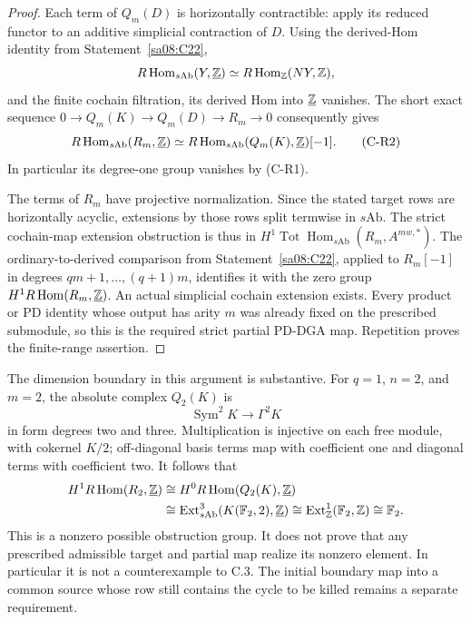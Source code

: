 \begin{proof}
Each term of $Q_m(D)$ is horizontally contractible: apply its
reduced functor to an additive simplicial contraction of $D$.
Using the derived-Hom identity from
Statement~\ref{sa08:C22},
\[
 R\operatorname{Hom}_{s\mathrm{Ab}}(Y,\underline{\mathbb Z})
       \simeq R\operatorname{Hom}_{\mathbb Z}(NY,\mathbb Z),
\]
and the finite cochain filtration, its derived Hom into
$\underline{\mathbb Z}$ vanishes. The short exact sequence
$0\to Q_m(K)\to Q_m(D)\to R_m\to0$ consequently gives
\begin{equation}
 R\operatorname{Hom}_{s\mathrm{Ab}}(R_m,\underline{\mathbb Z})
 \simeq
 R\operatorname{Hom}_{s\mathrm{Ab}}(Q_m(K),\underline{\mathbb Z})[-1].
 \tag{C-R2}
\end{equation}
In particular its degree-one group vanishes by (C-R1).

The terms of $R_m$ have projective normalization. Since the
stated target rows are horizontally acyclic, extensions by those
rows split termwise in $s\mathrm{Ab}$. The strict cochain-map
extension obstruction is thus in
$H^1\operatorname{Tot}\operatorname{Hom}_{s\mathrm{Ab}}
(R_m,A^{mw,*})$. The ordinary-to-derived comparison from
Statement~\ref{sa08:C22}, applied to $R_m[-1]$ in degrees
$qm+1,\ldots,(q+1)m$, identifies it with the zero group
$H^1R\operatorname{Hom}(R_m,\underline{\mathbb Z})$.
An actual simplicial cochain extension exists. Every product or
PD identity whose output has arity $m$ was already fixed on
the prescribed submodule, so this is the required strict partial
PD-DGA map. Repetition proves the finite-range assertion.
\end{proof}

The dimension boundary in this argument is substantive. For
$q=1$, $n=2$, and $m=2$, the absolute complex $Q_2(K)$ is
\[
 \operatorname{Sym}^2K\longrightarrow\Gamma^2K
\]
in form degrees two and three. Multiplication is injective on
each free module, with cokernel $K/2$; off-diagonal basis terms
map with coefficient one and diagonal terms with coefficient two.
It follows that
\[
 \begin{split}
 H^1R\operatorname{Hom}(R_2,\underline{\mathbb Z})
 &\cong H^0R\operatorname{Hom}(Q_2(K),\underline{\mathbb Z})\\
 &\cong \operatorname{Ext}_{s\mathrm{Ab}}^3
             (K(\mathbb F_2,2),\underline{\mathbb Z})
 \cong \operatorname{Ext}_{\mathbb Z}^1(\mathbb F_2,\mathbb Z)
 \cong\mathbb F_2.
 \end{split}
\]
This is a nonzero possible obstruction group. It does not prove
that any prescribed admissible target and partial map realize its
nonzero element. In particular it is not a counterexample to C.3.
The initial boundary map into a common source whose row still
contains the cycle to be killed remains a separate requirement.

